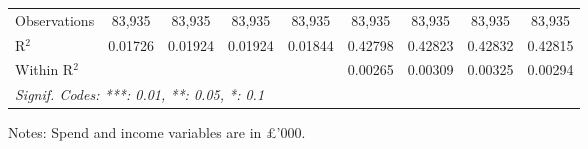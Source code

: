 \begin{table}[htbp]
\begin{threeparttable}[b]
\begin{tabular}{lcccccccc}
         Observations                & 83,935           & 83,935           & 83,935           & 83,935           & 83,935          & 83,935           & 83,935           & 83,935\\  
         R$^2$                       & 0.01726          & 0.01924          & 0.01924          & 0.01844          & 0.42798         & 0.42823          & 0.42832          & 0.42815\\  
         Within R$^2$                &                  &                  &                  &                  & 0.00265         & 0.00309          & 0.00325          & 0.00294\\  
         \midrule \midrule
         \multicolumn{9}{l}{\emph{Signif. Codes: ***: 0.01, **: 0.05, *: 0.1}}\\
      \end{tabular}
      
      \begin{tablenotes}\footnotesize
         \item Notes: Spend and income variables are in \pounds'000.
      \end{tablenotes}
   \end{threeparttable}
\end{table}


